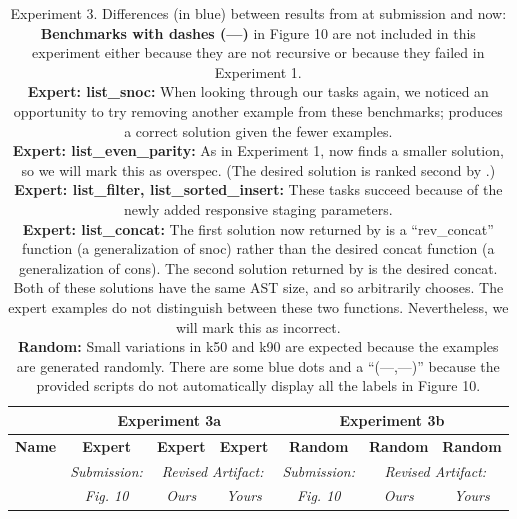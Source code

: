 \begin{table}

\experimentTableSize

\begin{tabular}{l|cccccc}
& \multicolumn{3}{c}{\textbf{Experiment 3a}}
& \multicolumn{3}{c}{\textbf{Experiment 3b}} \\\hline
\textbf{Name} &
\textbf{Expert} & \textbf{Expert} & \textbf{Expert} &
\textbf{Random} & \textbf{Random} & \textbf{Random} \\
&
\textit{Submission:} & \multicolumn{2}{c}{\textit{Revised Artifact:}} &
\textit{Submission:} & \multicolumn{2}{c}{\textit{Revised Artifact:}} \\
&
\textit{Fig. 10} & \textit{Ours} & \textit{Yours} &
\textit{Fig. 10} & \textit{Ours} & \textit{Yours} \\

\end{tabular}

\vspace{0.10in}

\caption{Experiment 3.
%
Differences (in blue) between results from \snsMyth{} at submission and
\snsMyth{} now:
%
\experimentCaptionSize
%
\\[3pt]
%
\textbf{Benchmarks with dashes ({---})} in Figure 10 are not included in this
experiment either because they are not recursive or because they failed in
Experiment 1.
%
\\[3pt]
%
\textbf{Expert: list\_snoc:} When looking through our tasks again, we noticed an
opportunity to try removing another example from these benchmarks; \snsMyth{}
produces a correct solution given the fewer examples.
%
\\[3pt]
%
\textbf{Expert: list\_even\_parity:} As in Experiment 1, \snsMyth{} now finds a
smaller solution, so we will mark this as {\scriptsize{overspec}}. (The desired
solution is ranked second by \snsMyth{}.)
%
\\[3pt]
%
\textbf{Expert: list\_filter, list\_sorted\_insert:} These tasks succeed because
of the newly added responsive staging parameters.
%
%
%
\\[3pt]
%
\textbf{Expert: list\_concat:} The first solution now returned by \snsMyth{} is
a ``rev\_concat'' function (a generalization of snoc) rather than the desired
concat function (a generalization of cons). The second solution returned by
\snsMyth{} is the desired concat. Both of these solutions have the same AST
size, and so \snsMyth{} arbitrarily chooses. The \myth{} expert examples do not
distinguish between these two functions. Nevertheless, we will mark this as
{\scriptsize{incorrect}}.
%
\\[3pt]
%
\textbf{Random:} Small variations in k50 and k90 are expected because the
examples are generated randomly. There are some blue dots and a ``(---,---)''
because the provided scripts do not automatically display all the labels in
Figure 10.
%
}

\end{table}
